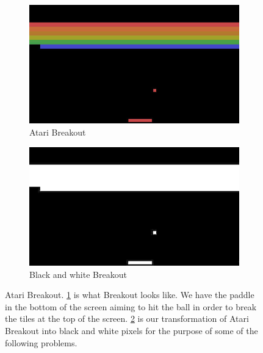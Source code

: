 \documentclass[11pt,addpoints,answers]{exam}
\begin{document}
\begin{questions}
\begin{figure}[H]
    \centering
    \begin{subfigure}{0.5\textwidth}
        \includegraphics[width=0.99\linewidth]{atari_crop_color.png}
        \caption{Atari Breakout}
        \label{fig:breakout}
    \end{subfigure}%
    \begin{subfigure}{0.5\textwidth}
        \includegraphics[width=0.99\linewidth]{atari_crop_bw.png}
        \caption{Black and white Breakout}
        \label{fig:bw_breakout}
    \end{subfigure}
    \caption{Atari Breakout. \ref{fig:breakout} is what Breakout looks like. We have the paddle in the bottom of the screen aiming to hit the ball in order to break the tiles at the top of the screen. \ref{fig:bw_breakout} is our transformation of Atari Breakout into black and white pixels for the purpose of some of the following problems.}
    \label{fig:my_label}
\end{figure}

\end{questions}
\end{document}
